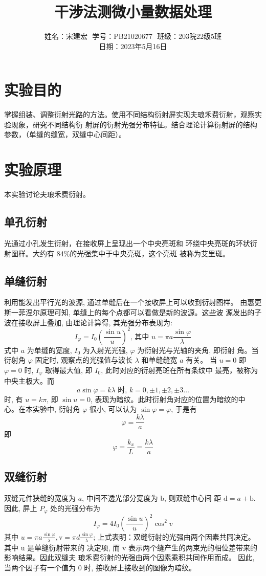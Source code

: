\documentclass{article}
\title{干涉法测微小量数据处理}
\author{姓名：宋建宏\,\, 学号：PB21020677\,\, 班级：203院22级5班\\ 日期：2023年5月16日}
\date{}
\begin{document}
\maketitle

\section*{实验目的}
掌握组装、调整衍射光路的方法。使用不同结构衍射屏实现夫琅禾费衍射，观察实验现象，研究不同结构衍
射屏的衍射光强分布特征。结合理论计算衍射屏的结构参数，（单缝的缝宽，双缝中心间距）。

\section*{实验原理}
本实验讨论夫琅禾费衍射。
\subsection*{单孔衍射}
光通过小孔发生衍射，在接收屏上呈现出一个中央亮斑和
环绕中央亮斑的环状衍射图样。大约有 84\%的光强集中于中央亮斑，这个亮斑
被称为艾里斑。
\subsection*{单缝衍射}
利用能发出平行光的波源, 通过单缝后在一个接收屏上可以收到衍射图样。 由惠更斯一菲涅尔原理可知, 单缝上的每个点都可以看做是新的波源。这些波 源发出的子波在接收屏上叠加, 由理论计算得, 其光强分布表现为:
$$
I_{\varphi}=I_0\left(\frac{\sin u}{u}\right)^2 \text {, 其中 } u=\pi a \frac{\sin \varphi}{\lambda}
$$
式中 $a$ 为单缝的宽度, $I_0$ 为入射光光强, $\varphi$ 为衍射光与光轴的夹角, 即衍射 角。当衍射角 $\varphi$ 固定时, 观察点的光强值与波长 $\lambda$ 和单缝缝宽 $a$ 有关。
当 $u=0$ 即 $\varphi=0$ 时, $I_\varphi$ 取得最大值, 即 $I_0$, 此时对应的衍射亮斑在所有条纹中 最亮，被称为中央主极大。而
$$
a \sin \varphi=k \lambda \text { 时, } k=0, \pm 1, \pm 2, \pm 3 \ldots
$$
时, 有 $u=k \pi$, 即 $\sin u=0$, 表现为暗纹。此时衍射角对应的位置为暗纹的中 心。在本实验中, 衍射角 $\varphi$ 很小, 可以认为 $\sin \varphi=\varphi$, 于是有
$$
\varphi=\frac{k \lambda}{a}
$$
即
$$
\varphi=\frac{k_x}{L}=\frac{k \lambda}{a}
$$
\subsection*{双缝衍射}
双缝元件狭缝的宽度为 $a$, 中间不透光部分宽度为 $\mathrm{b}$, 则双缝中心间 距 $\mathrm{d}=a+\mathrm{b}$. 因此, 屏上 $P_{\varphi}$ 处的光强分布为
$$
I_{\varphi}=4 I_0\left(\frac{\sin u}{u}\right)^2 \cos ^2 v
$$
其中 $u=\pi a \frac{\sin \varphi}{\lambda}, \mathrm{v}=\pi d \frac{\sin \varphi}{\lambda}$;
上式表明：双缝衍射的光强由两个因素共同决定。其中 $\mathrm{u}$ 是单缝衍射带来的 决定项, 而 $\mathrm{v}$ 表示两个缝产生的两束光的相位差带来的影响结果。因此双缝夫
琅禾费衍射的光强由两个因素乘积共同作用而成。
因此, 当两个因子有一个值为 0 时, 接收屏上接收到的图像为暗纹。
\end{document}
